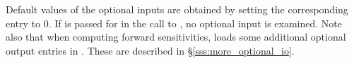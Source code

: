 Default values of the optional inputs are obtained by setting the corresponding
entry to 0. If  is passed for  in the call to ,
no optional input is examined.
Note also that when computing forward sensitivities, {\cvodes} loads some
additional optional output entries in . 
These are described in \S\ref{sss:more_optional_io}.
%
